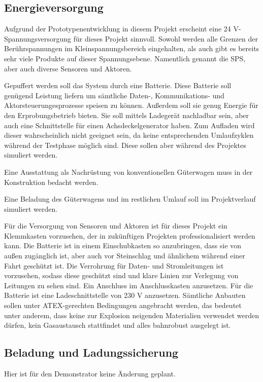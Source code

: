 \subsection{Energieversorgung}
Aufgrund der Prototypenentwicklung in diesem Projekt erscheint eine 24 V-Spannungsversorgung für dieses Projekt sinnvoll. Sowohl werden alle Grenzen der Berührspannungen im Kleinspannungsbereich eingehalten, als auch gibt es bereits sehr viele Produkte auf dieser Spannungsebene. Namentlich genannt die SPS, aber auch diverse Sensoren und Aktoren.\par
Gepuffert werden soll das System durch eine Batterie. Diese Batterie soll genügend Leistung liefern um sämtliche Daten-, Kommunikations- und Aktorsteuerungesprozesse speisen zu können. Außerdem soll sie genug Energie für den Erprobungsbetrieb bieten. Sie soll mittels Ladegerät nachladbar sein, aber auch eine Schnittstelle für einen Achsdeckelgenerator haben. Zum Aufladen wird dieser wahrscheinlich nicht geeignet sein, da keine entsprechenden Umlaufzyklen während der Testphase möglich sind. Diese sollen aber während des Projektes simuliert werden.\par
Eine Ausstattung als Nachrüstung von konventionellen Güterwagen muss in der Konstruktion bedacht werden.\par
Eine Beladung des Güterwagens und im restlichen Umlauf soll im Projektverlauf simuliert werden.\par
Für die Versorgung von Sensoren und Aktoren ist für dieses Projekt ein Klemmkasten vorzusehen, der in zukünftigen Projekten professionalisiert werden kann. Die Batterie ist in einem Einschubkasten so anzubringen, dass sie von außen zugänglich ist, aber auch vor Steinschlag und ähnlichem während einer Fahrt geschützt ist. Die Verrohrung für Daten- und Stromleitungen ist vorzusehen, sodass diese geschützt sind und klare Linien zur Verlegung von Leitungen zu sehen sind. Ein Anschluss im Anschlusskasten anzusetzen. Für die Batterie ist eine Ladeschnittstelle von 230 V anzusetzen. Sämtliche Anbauten sollen unter ATEX-gerechten Bedingungen angebracht werden, das bedeutet unter anderem, dass keine zur Explosion neigenden Materialien verwendet werden dürfen, kein Gasaustausch stattfindet und alles bahnrobust ausgelegt ist.\par
\subsection{Beladung und Ladungssicherung}
Hier ist für den Demonstrator keine Änderung geplant.
